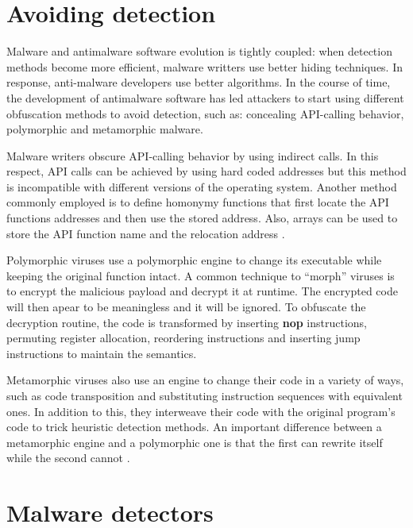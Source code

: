 
\section{Avoiding detection}
\label{sec:avoid-det}

Malware and antimalware software evolution is tightly coupled: when detection methods become more efficient, malware writters use better hiding techniques. In response, anti-malware developers use better algorithms. In the course of time, the development of antimalware software has led attackers to start using different obfuscation methods to avoid detection, such as: concealing API-calling behavior, polymorphic and metamorphic malware.

Malware writers obscure API-calling behavior by using indirect calls. In this respect, API calls can be achieved by using hard coded addresses but this method is incompatible with different versions of the operating system. Another method commonly employed is to define homonymy functions that first locate the API functions addresses and then use the stored address. Also, arrays can be used to store the API function name and the relocation address \cite{static-detection-behavior}.

Polymorphic viruses use a polymorphic engine to change its executable while keeping the original function intact. A common technique to ``morph'' viruses is to encrypt the malicious payload and decrypt it at runtime. The encrypted code will then apear to be meaningless and it will be ignored. To obfuscate the decryption routine, the code is transformed by inserting \textbf{nop} instructions, permuting register allocation, reordering instructions and inserting jump instructions to maintain the semantics.

Metamorphic viruses also use an engine to change their code in a variety of ways, such as code transposition and substituting instruction sequences with equivalent ones. In addition to this, they interweave their code with the original program's code to trick heuristic detection methods. An important difference between a metamorphic engine and a polymorphic one is that the first can rewrite itself while the second cannot \cite{testing-mal-det}.

\section{Malware detectors}
\label{sec:mal-detectors}

